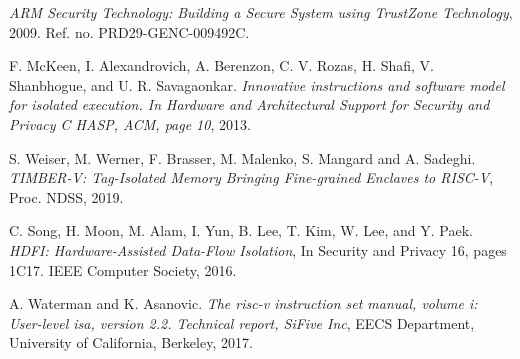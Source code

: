 \documentclass[conference]{IEEEtran}
\begin{document}

\begin{thebibliography}{1}

\emph{ARM Security Technology: Building a Secure System using TrustZone Technology}, 2009. Ref. no. PRD29-GENC-009492C.

F. McKeen, I. Alexandrovich, A. Berenzon, C. V. Rozas, H. Shafi, V. Shanbhogue, and U. R. Savagaonkar.
\emph{Innovative instructions and software model for isolated execution. In Hardware and Architectural
Support for Security and Privacy C HASP, ACM, page 10}, 2013. 

S. Weiser, M. Werner, F. Brasser, M. Malenko, S. Mangard and A. Sadeghi.
\emph{TIMBER-V: Tag-Isolated Memory Bringing Fine-grained Enclaves to RISC-V},
Proc. NDSS, 2019.

C. Song, H. Moon, M. Alam, I. Yun, B. Lee, T. Kim, W. Lee, and Y. Paek. 
\emph{HDFI: Hardware-Assisted Data-Flow Isolation},
In Security and Privacy 16, pages 1C17. IEEE Computer Society, 2016.

A. Waterman and K. Asanovic. 
\emph{The risc-v instruction set manual,
volume i: User-level isa, version 2.2. Technical report, SiFive Inc},
EECS Department, University of California, Berkeley, 2017.

\end{thebibliography}
\end{document}
